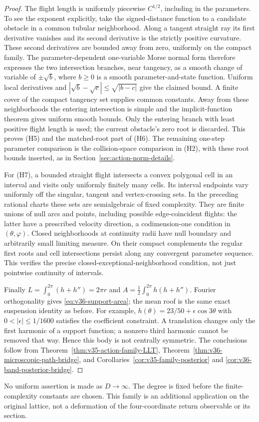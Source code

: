 \begin{proof}
The flight length is uniformly piecewise $C^{1/2}$, including in the
parameters. To see the exponent explicitly, take the signed-distance
function to a candidate obstacle in a common tubular neighborhood.
Along a tangent straight ray its first derivative vanishes and its
second derivative is the strictly positive curvature. These second
derivatives are bounded away from zero, uniformly on the compact
family. The parameter-dependent one-variable Morse normal form
therefore expresses the two intersection branches, near tangency, as
a smooth change of variable of $\pm\sqrt{b}$, where $b\ge0$ is a
smooth parameter-and-state function. Uniform local derivatives and
$|\sqrt b-\sqrt c|\le\sqrt{|b-c|}$ give the claimed bound.
A finite cover of the compact tangency set supplies common constants.
Away from these neighborhoods the entering intersection is simple
and the implicit-function theorem gives uniform smooth bounds.
Only the entering branch with least positive flight length is used;
the current obstacle's zero root is discarded. This proves (H5)
and the matched-root part of (H6). The remaining one-step parameter
comparison is the collision-space comparison in (H2), with these
root bounds inserted, as in Section~\ref{sec:action-norm-details}.

For (H7), a bounded straight flight intersects a convex polygonal
cell in an interval and visits only uniformly finitely many cells.
Its interval endpoints vary uniformly off the singular, tangent and
vertex-crossing sets. In the preceding rational charts these sets
are semialgebraic of fixed complexity. They are finite unions of
null arcs and points, including possible edge-coincident flights:
the latter have a prescribed velocity direction, a codimension-one
condition in $(\theta,\varphi)$. Closed neighborhoods at continuity
radii have null boundary and arbitrarily small limiting measure.
On their compact complements the regular first roots and cell
intersections persist along any convergent parameter sequence.
This verifies the precise closed-exceptional-neighborhood condition,
not just pointwise continuity of intervals.

Finally $L=\int_0^{2\pi}(h+h'')=2\pi r$ and
$A=\tfrac12\int_0^{2\pi}h(h+h'')$. Fourier orthogonality gives
\eqref{eq:v36-support-area}; the mean roof is the same exact suspension
identity as before. For example, $h(\theta)=23/50+\epsilon\cos3\theta$
with $0<|\epsilon|\le1/1600$ satisfies the coefficient constraint.
A translation changes only the first harmonic of a support function;
a nonzero third harmonic cannot be removed that way. Hence this body
is not centrally symmetric. The conclusions follow from
Theorem~\ref{thm:v35-action-family-LLT},
Theorem~\ref{thm:v36-microscopic-path-bridge}, and
Corollaries~\ref{cor:v35-family-posterior} and
\ref{cor:v36-band-posterior-bridge}.
\end{proof}

No uniform assertion is made as $D\to\infty$. The degree is fixed
before the finite-complexity constants are chosen. This family is an
additional application on the original lattice, not a deformation of
the four-coordinate return observable or its section.
